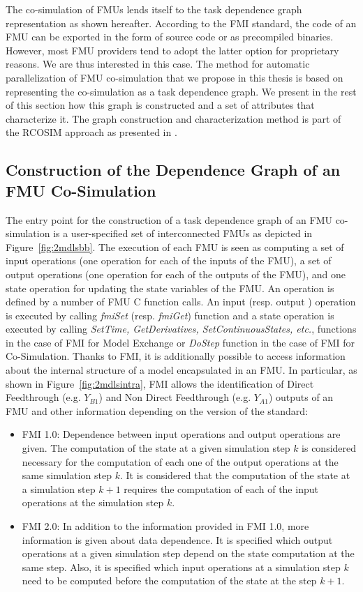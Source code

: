 The co-simulation of FMUs lends itself to the task dependence graph representation as shown hereafter. According to the FMI standard, the code of an FMU can be exported in the form of source code or as precompiled binaries. However, most FMU providers tend to adopt the latter option for proprietary reasons. We are thus interested in this case. The method for automatic parallelization of FMU co-simulation that we propose in this thesis is based on representing the co-simulation as a task dependence graph. We present in the rest of this section how this graph is constructed and a set of attributes that characterize it. The graph construction and characterization method is part of the RCOSIM approach as presented in \cite{benkhaled:2014}.

\subsection{Construction of the Dependence Graph of an FMU Co-Simulation}

The entry point for the construction of a task dependence graph of an FMU co-simulation is a user-specified set of interconnected FMUs as depicted in Figure~\ref{fig:2mdlsbb}. The execution of each FMU is seen as computing a set of input operations (one operation for each of the inputs of the FMU), a set of output operations (one operation for each of the outputs of the FMU), and one state operation for updating the state variables of the FMU. An operation is defined by a number of FMU C function calls. An input (resp. output ) operation is executed by calling \textit{fmiSet} (resp. \textit{fmiGet}) function and a state operation is executed by calling \textit{SetTime, GetDerivatives, SetContinuousStates, etc.}, functions in the case of FMI for Model Exchange or \textit{DoStep} function in the case of FMI for Co-Simulation. Thanks to FMI, it is additionally possible to access information about the internal structure of a model encapsulated in an FMU. In particular, as shown in Figure~\ref{fig:2mdlsintra}, FMI allows the identification of Direct Feedthrough (e.g. $Y_{B1}$) and Non Direct Feedthrough (e.g. $Y_{A1}$) outputs of an FMU and other information depending on the version of the standard:

\begin{itemize}
\item FMI 1.0: Dependence between input operations and output operations are given. The computation of the state at a given simulation step $k$ is considered necessary for the computation of each one of the output operations at the same simulation step $k$. It is considered that the computation of the state at a simulation step $k+1$ requires the computation of each of the input operations at the simulation step $k$.
\item FMI 2.0: In addition to the information provided in FMI 1.0, more information is given about data dependence. It is specified which output operations at a given simulation step depend on the state computation at the same step. Also, it is specified which input operations at a simulation step $k$ need to be computed before the computation of the state at the step $k+1$.  
\end{itemize}

